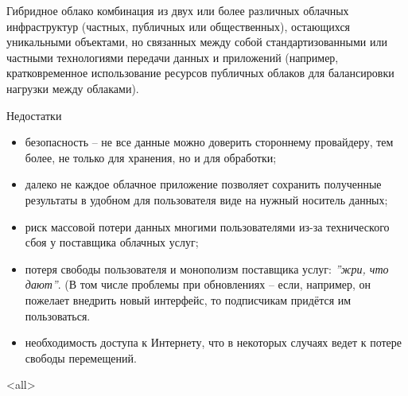 \begin{frame}{Гибридное облако}
комбинация из двух или более различных облачных инфраструктур (частных,  публичных или общественных),  остающихся уникальными объектами,  но связанных между собой стандартизованными или частными технологиями передачи данных и приложений (например,  кратковременное использование ресурсов публичных облаков для балансировки нагрузки между облаками).
\end{frame}

\begin{frame}{Недостатки}
	\begin{itemize}
		\item безопасность --  не все данные можно доверить стороннему провайдеру, тем более, не только для хранения, но и для обработки;
			\pause
		\item далеко не каждое облачное приложение позволяет сохранить полученные результаты в удобном для пользователя виде на нужный носитель данных;
			\pause
		\item риск массовой потери данных многими пользователями из-за технического сбоя у поставщика облачных услуг;
			\pause
		\item потеря свободы пользователя и монополизм поставщика услуг: {\it ''жри, что дают''}.
			(В том числе проблемы при обновлениях -- если, например, он пожелает внедрить новый интерфейс, то подписчикам придётся им пользоваться.
			\pause
		\item необходимость доступа к Интернету, что в некоторых случаях ведет к потере свободы перемещений. 
	\end{itemize}
\end{frame}


\mode<all>{}


